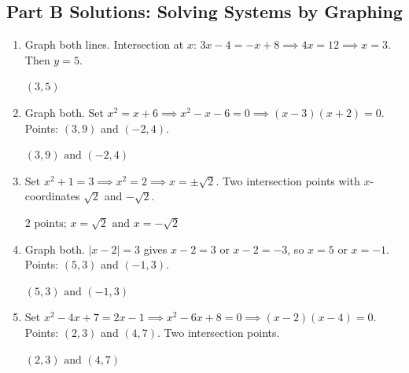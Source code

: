 \documentclass[14pt]{extarticle}
\begin{document}
\subsection*{Part B Solutions: Solving Systems by Graphing}
\begin{enumerate}
  \item Graph both lines. Intersection at \(x\): \(3x - 4 = -x + 8 \implies 4x = 12 \implies x = 3\). Then \(y = 5\).

  \(\boxed{(3, 5)}\)

  \item Graph both. Set \(x^2 = x + 6 \implies x^2 - x - 6 = 0 \implies (x-3)(x+2) = 0\). Points: \((3, 9)\) and \((-2, 4)\).

  \(\boxed{(3, 9) \text{ and } (-2, 4)}\)

  \item Set \(x^2 + 1 = 3 \implies x^2 = 2 \implies x = \pm\sqrt{2}\). Two intersection points with \(x\)-coordinates \(\sqrt{2}\) and \(-\sqrt{2}\).

  \(\boxed{2 \text{ points; } x = \sqrt{2} \text{ and } x = -\sqrt{2}}\)

  \item Graph both. \(|x - 2| = 3\) gives \(x - 2 = 3\) or \(x - 2 = -3\), so \(x = 5\) or \(x = -1\). Points: \((5, 3)\) and \((-1, 3)\).

  \(\boxed{(5, 3) \text{ and } (-1, 3)}\)

  \item Set \(x^2 - 4x + 7 = 2x - 1 \implies x^2 - 6x + 8 = 0 \implies (x-2)(x-4) = 0\). Points: \((2, 3)\) and \((4, 7)\). Two intersection points.

  \(\boxed{(2, 3) \text{ and } (4, 7)}\)
\end{enumerate}
\end{document}
